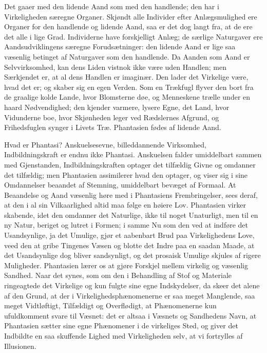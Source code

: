 \documentclass[12pt]{book}
\newcommand{\apage}[1]{\marginnote{\footnotesize\textit{[#1]}}}
\begin{document}
Det gaaer med den lidende Aand som med den handlende; den har i Virkeligheden
særegne Organer. Skjøndt alle Individer efter Anlægsmulighed ere Organer for
den handlende og lidende Aand, saa er det dog langt fra, at de ere det alle i
lige Grad. Individerne have forskjelligt Anlæg; de særlige Naturgaver ere
Aandsudviklingens særegne Forudsætninger: den lidende Aand er lige saa
væsenlig betinget af Naturgaver som den handlende. Da Aanden som Aand er
Selvvirksomhed, kan dens Liden vistnok ikke være uden Handlen; men Særkjendet
er, at al dens Handlen er imaginær. Den lader det Virkelige være, hvad det
er; og skaber sig en egen Verden. Som en Trækfugl flyver den bort fra de
graalige kolde Lande, hvor Blomsterne døe, og Menneskene trælle under en
haard Nødvendighed; den kjender varmere, lysere Egne, det Land, hvor
Vidunderne boe, hvor Skjønheden leger ved Rædslernes Afgrund, og
Frihedsfuglen synger i Livets Træ. Phantasien fødes af lidende Aand.

Hvad er Phantasi? Anskuelsesevne, billeddannende Virksomhed, Indbildningskraft
er endnu ikke Phantasi. Anskuelsen falder umiddelbart sammen med Gjenstanden,
Indbildningskraften optager det tilfældig Givne \apage{246} og omdanner det tilfældig;
men Phantasien assimilerer hvad den optager, og viser sig i sine Omdannelser
beaandet af Stemning, umiddelbart bevæget af Formaal. At Beaandelse og Aand
væsenlig høre med i Phantasiens Frembringelser, sees deraf, at den i al sin
Vilkaarlighed altid maa følge en høiere Lov. Phantasien virker skabende, idet
den omdanner det Naturlige, ikke til noget Unaturligt, men til en ny Natur,
beriget og lutret i Formen; i samme Nu som den ved at indføre det
Usandsynlige, ja det Umulige, gjør et aabenbart Brud paa Virkelighedens Love,
veed den at gribe Tingenes Væsen og blotte det Indre paa en saadan Maade, at
det Usandsynlige dog bliver sandsynligt, og det prosaisk Umulige skjules af
rigere Muligheder. Phantasien lærer os at gjøre Forskjel mellem virkelig og
væsenlig Sandhed. Naar det synes, som om den i Behandling af Stof og Materiale
ringeagtede det Virkelige og kun fulgte sine egne Indskydelser, da skeer det
alene af den Grund, at der i Virkelighedsphænomenerne er saa meget Manglende,
saa meget Vidtløftigt, Tilfældigt og Overflødigt, at Phænomenerne kun
ufuldkomment svare til Væsnet: det er altsaa i Væsnets og Sandhedens Navn, at
Phantasien sætter sine egne Phænomener i de virkeliges Sted, og giver det
Indbildte en saa skuffende Lighed med Virkeligheden selv, at vi fortrylles af
Illusionen.
\end{document}
